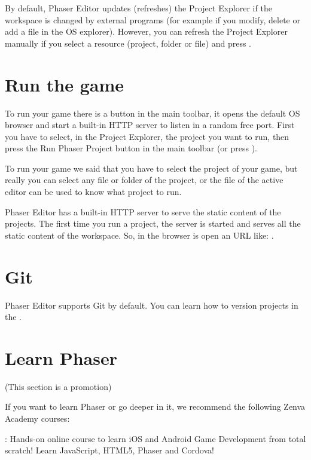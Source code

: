 \documentclass[letterpaper,10pt,english]{sphinxmanual}
\begin{document}
\noindent{}

By default, Phaser Editor updates (refreshes) the Project Explorer if the workspace is changed by external programs (for example if you modify, delete or add a file in the OS explorer). However, you can refresh the Project Explorer manually if you select a resource (project, folder or file) and press  .


\section{Run the game}
\label{\detokenize{first_steps:run-the-game}}
To run your game there is a button in the main toolbar, it opens the default OS browser and start a built-in HTTP server to listen in a random free port. First you have to select, in the Project Explorer, the project you want to run, then press the Run Phaser Project button in the main toolbar (or press  ).

\noindent{}

To run your game we said that you have to select the project of your game, but really you can select any file or folder of the project, or the file of the active editor can be used to know what project to run.

Phaser Editor has a built-in HTTP server to serve the static content of the projects. The first time you run a project, the server is started and serves all the static content of the workspace. So, in the browser is open an URL like: .


\section{Git}
\label{\detokenize{first_steps:git}}
Phaser Editor supports Git by default. You can learn how to version projects in the  .


\section{Learn Phaser}
\label{\detokenize{first_steps:learn-phaser}}
(This section is a promotion)

If you want to learn Phaser or go deeper in it, we recommend the following Zenva Academy courses:

: Hands-on online course to learn iOS and Android Game Development from total scratch! Learn JavaScript, HTML5, Phaser and Cordova!
\end{document}
